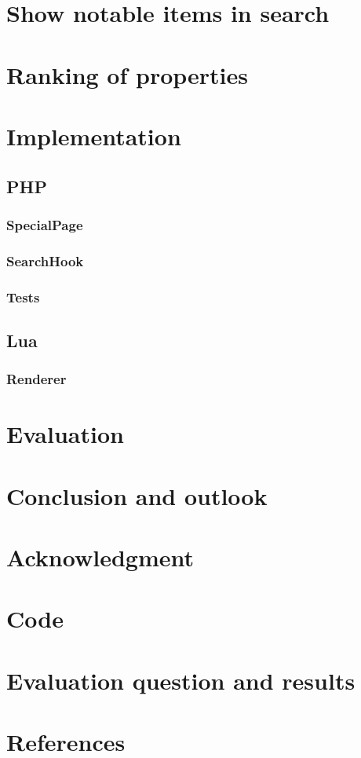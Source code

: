 \documentclass[11pt]{article}
\begin{document}
\section {Show notable items in search}

\section {Ranking of properties}

\section{Implementation}

\subsection {PHP}

\subsubsection {SpecialPage}

\subsubsection {SearchHook}

\subsubsection {Tests}

\subsection {Lua}

\subsubsection {Renderer}

\section{Evaluation}

\section{Conclusion and outlook}

\section{Acknowledgment}

\section{Code}

\section{Evaluation question and results}

\section{References}
\end{document}
